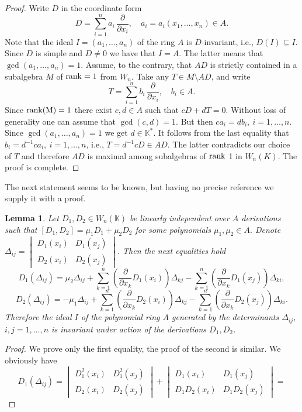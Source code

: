 \documentclass[12pt,a4paper]{amsart}
\theoremstyle{plain}
\newtheorem{lemma}{Lemma}
\theoremstyle{definition}
\begin{document}
{	\begin{proof} Write $D$ in the coordinate form
		$$	
		D = \sum_{i=1}^{n}a_i \, \frac{\partial}{\partial x_i}, \quad a_i=a_i(x_1, \ldots , x_n)\in A.
		$$	
		Note that the ideal $I=(a_1, \ldots, a_n)$ of the ring $A$ is $D$-invariant, i.e., $
		D(I) \subseteq I.$
		Since $D$ is simple and $D \neq 0$ we have that $I=A$. The latter means that
		$\gcd(a_1, \dots, a_n) = 1. $ 		Assume, to the contrary, that $AD$ is strictly contained in a subalgebra $M$ of  $\rm{rank} = 1$ from $W_n$. Take any $T \in M \setminus AD$, and write
		\[
		T = \sum_{i=1}^{n} b_i \,  \frac{\partial}{\partial x_i}, \quad b_i \in A.
		\]
		Since $\rm{rank}(M) = 1$ there exist $c, d \in A$ such that
		$cD + dT = 0.$ 		Without loss of generality one can assume that $\gcd(c,d) = 1$. But then $ca_i = db_i, \ i = 1, \dots,n$. Since $\gcd(a_1,\dots,a_n)=1$
		we get $d \in \mathbb{K}^*$. It follows from the last equality that $b_i = d^{-1}ca_i, \ i = 1,\dots,n$, i.e., $T = d^{-1}cD \in AD$. The latter contradicts our choice of $T$ and therefore $AD$ is maximal among subalgebras of $\rm{rank}$ 1 in $W_n(K)$. The proof is complete.
	\end{proof}
	The next statement seems to be known, but having no precise reference we supply it with a proof.	
	\begin{lemma}\label{invariant}
		Let $D_1, D_2 \in W_n(\mathbb{K})$ be  linearly independent over $A$ derivations such that    
		$[D_1, D_2] = \mu_1 D_1 + \mu_2 D_2$ for some polynomials $\mu_1, \mu_2 \in A.$ Denote 
		$\Delta_{ij} = \begin{vmatrix} D_1(x_i) & D_1(x_j) \\ D_2(x_i) & D_2(x_j) \end{vmatrix}$.
		Then the next equalities hold 
		$$
		D_1(\Delta_{ij}) = \mu_2 \Delta_{ij} + \sum_{k=1}^n \left(\frac{\partial}{\partial x_k} D_1(x_i)\right) \Delta_{kj} - \sum_{k=1}^n \left(\frac{\partial}{\partial x_k} D_1(x_j)\right) \Delta_{ki},	$$
		$$ 	D_2(\Delta_{ij}) = -\mu_1 \Delta_{ij} + \sum_{k=1}^n \left( \frac{\partial}{\partial x_k} D_2(x_i) \right) \Delta_{kj} - \sum_{k=1}^n \left( \frac{\partial}{\partial x_k} D_2(x_j) \right) \Delta_{ki}. 	$$
		Therefore  the ideal $I$ of the polynomial ring $A$ generated by the determinants $\Delta_{ij}$, $i,j=1,\dots,n$ is invariant under action of the derivations $D_1, D_2$.
	\end{lemma}
	
	\begin{proof} We prove only the first equality, the proof of the second is similar. We obviously have
		$$D_1(\Delta_{ij}) = \begin{vmatrix} D_1^2(x_i) & D_1^2(x_j) \\ D_2(x_i) & D_2(x_j) \end{vmatrix} + \begin{vmatrix} D_1(x_i) & D_1(x_j) \\ D_1 D_2(x_i) & D_1 D_2(x_j) \end{vmatrix}=$$
		

\end{proof}}
\end{document}
